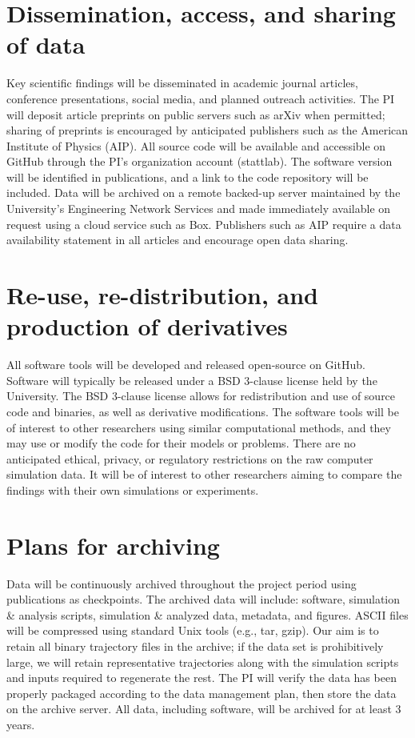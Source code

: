 \documentclass{article}
\begin{document}
\section{Dissemination, access, and sharing of data}
Key scientific findings will be disseminated in academic journal articles, conference presentations,
social media, and planned outreach activities. The PI will deposit article preprints on public
servers such as arXiv when permitted; sharing of preprints is encouraged by anticipated
publishers such as the American Institute of Physics (AIP). All source code will be available and
accessible on GitHub through the PI’s organization account (stattlab). The software version
will be identified in publications, and a link to the code repository will be included. Data will be
archived on a remote backed-up server maintained by the University’s Engineering Network
Services and made immediately available on request using a cloud service such as Box.
Publishers such as AIP require a data availability statement in all articles and encourage open
data sharing.
\section{Re-use, re-distribution, and production of derivatives}
All software tools will be developed and released open-source on GitHub. Software will typically
be released under a BSD 3-clause license held by the University. The BSD 3-clause license
allows for redistribution and use of source code and binaries, as well as derivative modifications.
The software tools will be of interest to other researchers using similar computational methods,
and they may use or modify the code for their models or problems. There are no anticipated
ethical, privacy, or regulatory restrictions on the raw computer simulation data. It will be of interest
to other researchers aiming to compare the findings with their own simulations or experiments.

\section{Plans for archiving}
Data will be continuously archived throughout the project period using publications as
checkpoints. The archived data will include: software, simulation \& analysis scripts, simulation \&
analyzed data, metadata, and figures. ASCII files will be compressed using standard Unix tools
(e.g., tar, gzip). Our aim is to retain all binary trajectory files in the archive; if the data set is
prohibitively large, we will retain representative trajectories along with the simulation scripts and
inputs required to regenerate the rest. The PI will verify the data has been properly packaged
according to the data management plan, then store the data on the archive server. All data,
including software, will be archived for at least 3 years.
\end{document}
